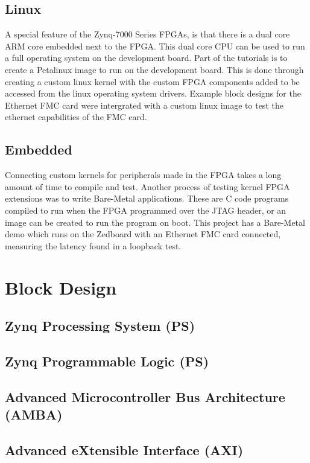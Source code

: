 \subsection{Linux}

\par A special feature of the Zynq-7000 Series FPGAs, is that there is a dual core ARM core embedded next to the FPGA.
This dual core CPU can be used to run a full operating system on the development board. Part of the tutorials is 
to create a Petalinux image to run on the development board. This is done through creating a custom linux kernel with
the custom FPGA components added to be accessed from the linux operating system drivers. Example block designs
for the Ethernet FMC card were intergrated with a custom linux image to test the ethernet capabilities of the FMC 
card.

\subsection{Embedded}

\par Connecting custom kernels for peripherals made in the FPGA takes a long amount of time to compile and test. 
Another process of testing kernel FPGA extensions was to write Bare-Metal applications. These are C code programs 
compiled to run when the FPGA programmed over the JTAG header, or an image can be created to run the program on boot.
This project has a Bare-Metal demo which runs on the Zedboard with an Ethernet FMC card connected, measuring the 
latency found in a loopback test. 

\section{Block Design}
\subsection{Zynq Processing System (PS)}
\subsection{Zynq Programmable Logic (PS)}
\subsection{Advanced Microcontroller Bus Architecture (AMBA)}
\subsection{Advanced eXtensible Interface (AXI)}
